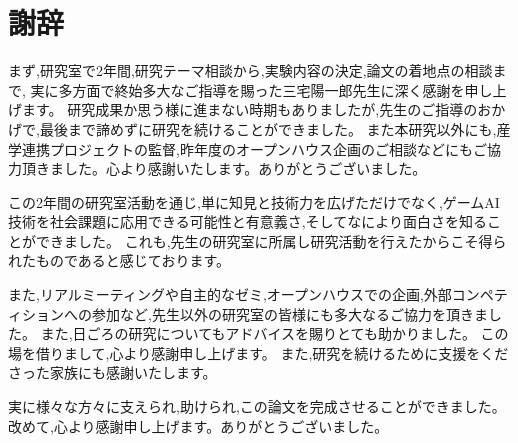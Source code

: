 \chapter*{謝辞}

まず,研究室で2年間,研究テーマ相談から,実験内容の決定,論文の着地点の相談まで,
実に多方面で終始多大なご指導を賜った三宅陽一郎先生に深く感謝を申し上げます。
研究成果か思う様に進まない時期もありましたが,先生のご指導のおかげで,最後まで諦めずに研究を続けることができました。
また本研究以外にも,産学連携プロジェクトの監督,昨年度のオープンハウス企画のご相談などにもご協力頂きました。心より感謝いたします。ありがとうございました。

この2年間の研究室活動を通じ,単に知見と技術力を広げただけでなく,ゲームAI技術を社会課題に応用できる可能性と有意義さ,そしてなにより面白さを知ることができました。
これも,先生の研究室に所属し研究活動を行えたからこそ得られたものであると感じております。

また,リアルミーティングや自主的なゼミ,オープンハウスでの企画,外部コンペティションへの参加など,先生以外の研究室の皆様にも多大なるご協力を頂きました。
また,日ごろの研究についてもアドバイスを賜りとても助かりました。
この場を借りまして,心より感謝申し上げます。
また,研究を続けるために支援をくださった家族にも感謝いたします。

実に様々な方々に支えられ,助けられ,この論文を完成させることができました。
改めて,心より感謝申し上げます。ありがとうございました。